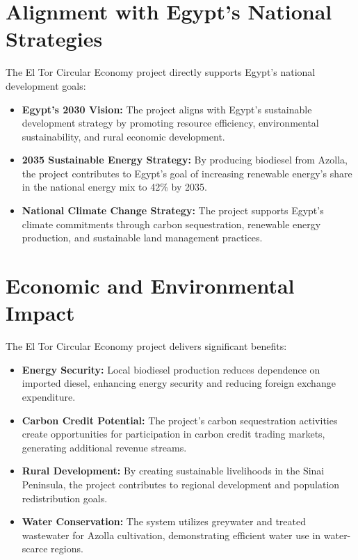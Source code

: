 \section{Alignment with Egypt's National Strategies}

The El Tor Circular Economy project directly supports Egypt's national development goals:

\begin{itemize}
    \item \textbf{Egypt's 2030 Vision:} The project aligns with Egypt's sustainable development strategy by promoting resource efficiency, environmental sustainability, and rural economic development.
    
    \item \textbf{2035 Sustainable Energy Strategy:} By producing biodiesel from Azolla, the project contributes to Egypt's goal of increasing renewable energy's share in the national energy mix to 42\% by 2035.
    
    \item \textbf{National Climate Change Strategy:} The project supports Egypt's climate commitments through carbon sequestration, renewable energy production, and sustainable land management practices.
\end{itemize}

\section{Economic and Environmental Impact}

The El Tor Circular Economy project delivers significant benefits:

\begin{itemize}
    \item \textbf{Energy Security:} Local biodiesel production reduces dependence on imported diesel, enhancing energy security and reducing foreign exchange expenditure.
    
    \item \textbf{Carbon Credit Potential:} The project's carbon sequestration activities create opportunities for participation in carbon credit trading markets, generating additional revenue streams.
    
    \item \textbf{Rural Development:} By creating sustainable livelihoods in the Sinai Peninsula, the project contributes to regional development and population redistribution goals.
    
    \item \textbf{Water Conservation:} The system utilizes greywater and treated wastewater for Azolla cultivation, demonstrating efficient water use in water-scarce regions.
\end{itemize}

